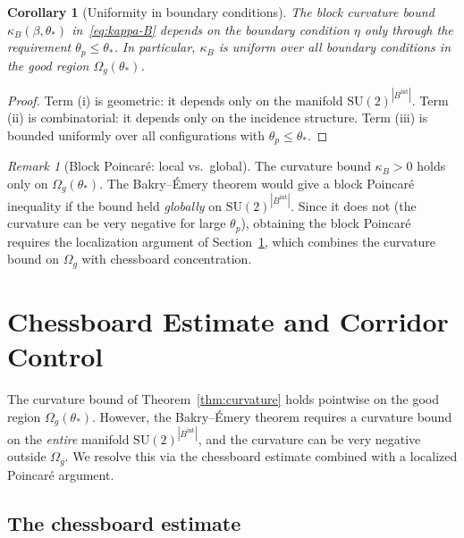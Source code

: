 \documentclass[11pt,a4paper]{article}
\theoremstyle{plain}
\newtheorem{corollary}[theorem]{Corollary}
\theoremstyle{definition}
\theoremstyle{remark}
\newtheorem{remark}[theorem]{Remark}
\newcommand{\SU}{\mathrm{SU}}
\begin{document}
\begin{corollary}[Uniformity in boundary conditions]\label{cor:uniform-eta}
The block curvature bound $\kappa_B(\beta,\theta_*)$
in~\eqref{eq:kappa-B} depends on the boundary condition $\eta$
only through the requirement $\theta_p \leq \theta_*$. In particular,
$\kappa_B$ is \emph{uniform} over all boundary conditions in the good
region $\Omega_g(\theta_*)$.
\end{corollary}

\begin{proof}
Term (i) is geometric: it depends only on the manifold
$\SU(2)^{|B^{\mathrm{int}}|}$. Term (ii) is combinatorial: it depends
only on the incidence structure. Term (iii) is bounded uniformly
over all configurations with $\theta_p \leq \theta_*$.
\end{proof}

\begin{remark}[Block Poincar\'e: local vs.\ global]
The curvature bound $\kappa_B > 0$ holds only on $\Omega_g(\theta_*)$.
The Bakry--\'Emery theorem would give a block Poincar\'e inequality
if the bound held \emph{globally} on $\SU(2)^{|B^{\mathrm{int}}|}$.
Since it does not (the curvature can be very negative for large
$\theta_p$), obtaining the block Poincar\'e requires the localization
argument of Section~\ref{sec:chessboard}, which combines the curvature
bound on $\Omega_g$ with chessboard concentration.
\end{remark}


\section{Chessboard Estimate and Corridor Control}\label{sec:chessboard}

The curvature bound of Theorem~\ref{thm:curvature} holds pointwise
on the good region $\Omega_g(\theta_*)$. However, the Bakry--\'Emery
theorem requires a curvature bound on the \emph{entire} manifold
$\SU(2)^{|B^{\mathrm{int}}|}$, and the curvature can be very negative
outside $\Omega_g$. We resolve this via the chessboard estimate
combined with a localized Poincar\'e argument.

\subsection{The chessboard estimate}
\end{document}
